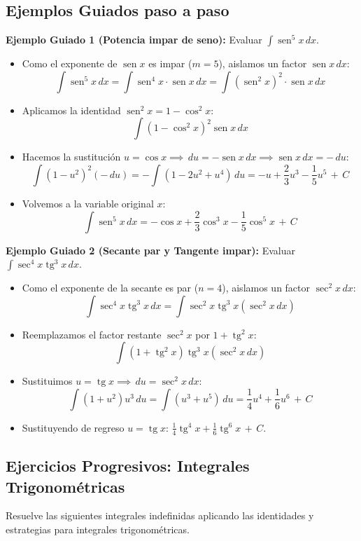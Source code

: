 \documentclass[12pt, letterpaper]{article}
\newcommand{\dx}{\,dx}
\newcommand{\du}{\,du}
\newcommand{\CC}{\,+\,C}
\DeclareMathOperator{\sen}{sen}
\DeclareMathOperator{\tg}{tg}
\begin{document}
\subsection{Ejemplos Guiados paso a paso}

\noindent\textbf{Ejemplo Guiado 1 (Potencia impar de seno):} Evaluar $\int \sen^5 x \dx$.
\begin{itemize}
  \item Como el exponente de $\sen x$ es impar ($m=5$), aislamos un factor $\sen x \dx$:
    $$\int \sen^5 x \dx = \int \sen^4 x \cdot \sen x \dx = \int (\sen^2 x)^2 \cdot \sen x \dx$$
  \item Aplicamos la identidad $\sen^2 x = 1 - \cos^2 x$:
    $$\int (1 - \cos^2 x)^2 \sen x \dx$$
  \item Hacemos la sustitución $u = \cos x \implies \du = -\sen x \dx \implies \sen x \dx = -\du$:
    $$\int (1 - u^2)^2 (-\du) = -\int (1 - 2u^2 + u^4) \du = -u + \frac{2}{3}u^3 - \frac{1}{5}u^5 \CC$$
  \item Volvemos a la variable original $x$:
    $$\int \sen^5 x \dx = -\cos x + \frac{2}{3}\cos^3 x - \frac{1}{5}\cos^5 x \CC$$
\end{itemize}

\vspace{4pt}
\noindent\textbf{Ejemplo Guiado 2 (Secante par y Tangente impar):} Evaluar $\int \sec^4 x \tg^3 x \dx$.
\begin{itemize}
  \item Como el exponente de la secante es par ($n=4$), aislamos un factor $\sec^2 x \dx$:
    $$\int \sec^4 x \tg^3 x \dx = \int \sec^2 x \tg^3 x (\sec^2 x \dx)$$
  \item Reemplazamos el factor restante $\sec^2 x$ por $1 + \tg^2 x$:
    $$\int (1 + \tg^2 x)\tg^3 x (\sec^2 x \dx)$$
  \item Sustituimos $u = \tg x \implies \du = \sec^2 x \dx$:
    $$\int (1 + u^2) u^3 \du = \int (u^3 + u^5) \du = \frac{1}{4}u^4 + \frac{1}{6}u^6 \CC$$
  \item Sustituyendo de regreso $u = \tg x$: $\frac{1}{4}\tg^4 x + \frac{1}{6}\tg^6 x \CC$.
\end{itemize}

\newpage

\subsection{Ejercicios Progresivos: Integrales Trigonométricas}
Resuelve las siguientes integrales indefinidas aplicando las identidades y estrategias para integrales trigonométricas.
\end{document}
